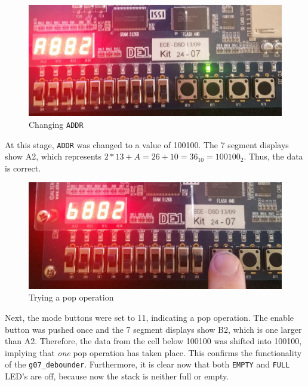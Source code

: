 \documentclass[12pt]{report}
\begin{document}
\begin{figure}[h]
	\begin{center}
		\caption{Changing \texttt{ADDR}}
		\includegraphics[scale=0.15]{fpga3}
	\end{center}
\end{figure}
At this stage, \texttt{ADDR} was changed to a value of 100100. The 7 segment displays show A2, which
represents $2*13 + A = 26 + 10 = 36_{10} = 100100_2$. Thus, the data is correct.

\begin{figure}[h]
	\begin{center}
		\caption{Trying a pop operation}
		\includegraphics[scale=0.15]{fpga4}
	\end{center}
\end{figure}
Next, the mode buttons were set to 11, indicating a pop operation. The enable button was pushed once
and the 7 segment displays show B2, which is one larger than A2. Therefore, the data from the cell
below 100100 was shifted into 100100, implying that \textit{one} pop operation has taken place. This
confirms the functionality of the \texttt{g07\_debounder}. Furthermore, it is clear now that both
\texttt{EMPTY} and \texttt{FULL} LED's are off, because now the stack is neither full or empty.
\end{document}
